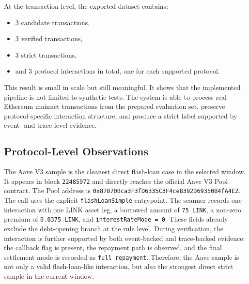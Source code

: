 At the transaction level, the exported dataset contains:

\begin{itemize}[leftmargin=1.5em]
    \item 3 candidate transactions,
    \item 3 verified transactions,
    \item 3 strict transactions,
    \item and 3 protocol interactions in total, one for each supported protocol.
\end{itemize}

This result is small in scale but still meaningful. It shows that the implemented pipeline is not limited to synthetic tests. The system is able to process real Ethereum mainnet transactions from the prepared evaluation set, preserve protocol-specific interaction structure, and produce a strict label supported by event- and trace-level evidence.

\subsection{Protocol-Level Observations}

The Aave V3 sample is the cleanest direct flash-loan case in the selected window. It appears in block \texttt{22485972} and directly reaches the official Aave V3 Pool contract. The Pool address is \texttt{0x87870Bca3F3fD633\allowbreak{}5C3F4ce8392D6935\allowbreak{}0B4fA4E2}. The call uses the explicit \texttt{flashLoanSimple} entrypoint. The scanner records one interaction with one LINK asset leg, a borrowed amount of \texttt{75 LINK}, a non-zero premium of \texttt{0.0375 LINK}, and \texttt{interestRateMode = 0}. These fields already exclude the debt-opening branch at the rule level. During verification, the interaction is further supported by both event-backed and trace-backed evidence: the callback flag is present, the repayment path is observed, and the final settlement mode is recorded as \texttt{full\_repayment}. Therefore, the Aave sample is not only a valid flash-loan-like interaction, but also the strongest direct strict sample in the current window.


